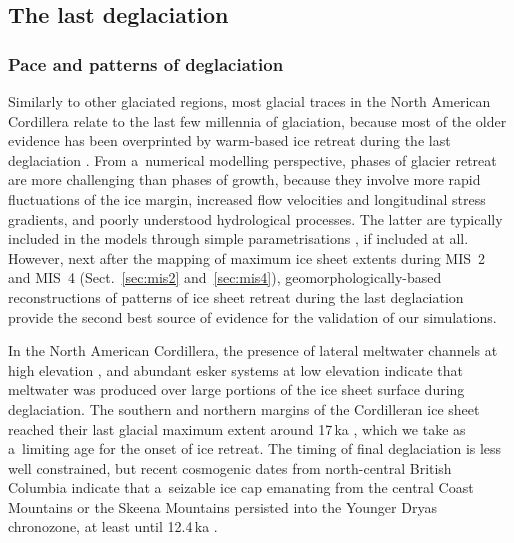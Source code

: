 \documentclass[tc, manuscript]{copernicus}
\begin{document}
\subsection{The last deglaciation}

\subsubsection{Pace and patterns of deglaciation}

      Similarly to other glaciated regions, most glacial traces in the North
      American Cordillera relate to the last few millennia of glaciation,
      because most of the older evidence has been overprinted by warm-based
      ice retreat during the last deglaciation \citep{Kleman.1994,
      Kleman.etal.2010}. From a~numerical modelling perspective, phases of
      glacier retreat are more challenging than phases of growth, because
      they involve more rapid fluctuations of the ice margin, increased flow
      velocities and longitudinal stress gradients, and poorly understood
      hydrological processes. The latter are typically included in the
      models through simple parametrisations
      \citep[e.g.][]{Clason.etal.2012, Clason.etal.2014, Bueler.Pelt.2015},
      if included at all. However, next after the mapping of maximum ice
      sheet extents during MIS~2 and MIS~4 (Sect.~\ref{sec:mis2}
      and~\ref{sec:mis4}), geomorphologically-based reconstructions of
      patterns of ice sheet retreat during the last deglaciation provide the
      second best source of evidence for the validation of our simulations.

      In the North American Cordillera, the presence of lateral meltwater
      channels at high elevation \citep{Margold.etal.2011,
      Margold.etal.2013a, Margold.etal.2014}, and abundant esker systems at
      low elevation \citep{Burke.etal.2012, Burke.etal.2012a,
      Perkins.etal.2013, Margold.etal.2013} indicate that meltwater was
      produced over large portions of the ice sheet surface during
      deglaciation. The southern and northern margins of the Cordilleran ice
      sheet reached their last glacial maximum extent around 17\,\unit{ka}
      \citep[Sect.~\ref{sec:timing};][]{Porter.Swanson.1998,
      Cosma.etal.2008, Stroeven.etal.2010, Stroeven.etal.2014}, which we
      take as a~limiting age for the onset of ice retreat. The timing of
      final deglaciation is less well constrained, but recent cosmogenic
      dates from north-central British Columbia indicate that a~seizable ice
      cap emanating from the central Coast Mountains or the Skeena Mountains
      persisted into the Younger Dryas chronozone, at least until
      12.4\,\unit{ka} \citep{Margold.etal.2014}.
\end{document}
